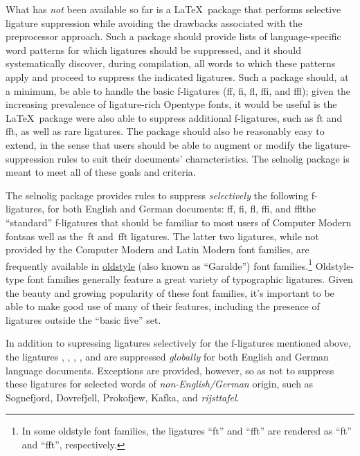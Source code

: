 \documentclass[11pt]{article}
\newcommand{\pkg}[1]{\textsf{#1}}
\begin{document}
What has \emph{not} been available so far is a \LaTeX\ package that performs selective ligature suppression while avoiding the drawbacks associated with the preprocessor approach. Such a package should provide lists of language-specific word patterns for which ligatures should be suppressed, and it should systematically discover, during compilation, all words to which these patterns apply and proceed to suppress the indicated ligatures. Such a package should, at a minimum, be able to handle the basic f-ligatures (ff, fi, fl, ffi, and ffl); given the increasing prevalence of ligature-rich Opentype fonts, it would  be useful is the \LaTeX\ package were also able to suppress additional f-ligatures, such as ft and fft, as well as rare ligatures. The package should also be reasonably easy to extend, in the sense that users should be able to augment or modify the ligature-suppression rules to suit their documents' characteristics. The \pkg{selnolig} package is meant to meet all of these goals and criteria. 

The \pkg{selnolig} package provides rules to suppress \emph{selectively} the following f-ligatures, for both English and German documents: ff, fi, fl, ffi, and ffl\textemdash the \enquote{standard} f-ligatures that should be familiar to most users of Computer Modern fonts\textemdash as well as the~ft and~fft ligatures. The latter two ligatures, while not provided by the Computer Modern and Latin Modern font families, are frequently available in \href{http://en.wikipedia.org/wiki/Serif#Old_Style}{oldstyle} (also known as \enquote{Garalde}) font families.\footnote{In some oldstyle font families, the ligatures \enquote{ft} and \enquote{fft} are rendered as \enquote{\sabon ft} and \enquote{\sabon fft}, respectively.} Oldstyle-type font families generally feature a great variety of typographic ligatures. Given the beauty and growing popularity of these font families, it's important to be able to make good use of many of their features, including the presence of ligatures outside the \enquote{basic five} set. 

In addition to supressing ligatures selectively for the f-ligatures mentioned above, the ligatures {\ebg {}, , , ,} and \emph{} are suppressed \emph{globally} for both English and German language documents. Exceptions are provided, however, so as not to suppress these ligatures for selected words of \emph{non-English\slash German} origin, such as {\ebg Sognefjord, Dovrefjell, Prokofjew, Kafka,} and \emph{rijsttafel}.
\end{document}
